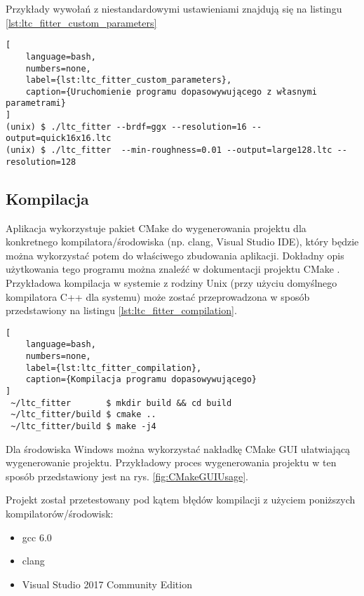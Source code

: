 \documentclass[../main.tex]{subfiles}
\begin{document}
Przykłady wywołań z niestandardowymi ustawieniami znajdują się na listingu \ref{lst:ltc_fitter_custom_parameters}

\begin{lstlisting}[
    language=bash,
    numbers=none,
    label={lst:ltc_fitter_custom_parameters},
    caption={Uruchomienie programu dopasowywującego z własnymi parametrami}
]
(unix) $ ./ltc_fitter --brdf=ggx --resolution=16 --output=quick16x16.ltc
(unix) $ ./ltc_fitter  --min-roughness=0.01 --output=large128.ltc --resolution=128
\end{lstlisting}

\subsection{Kompilacja}
\label{section:ltcFitterCompilation}

Aplikacja wykorzystuje pakiet CMake do wygenerowania projektu dla konkretnego kompilatora/środowiska (np. clang, Visual Studio IDE), który będzie można wykorzystać potem do właściwego zbudowania aplikacji. Dokładny opis użytkowania tego programu można znaleźć w dokumentacji projektu CMake \cite{CMakeDoc}. Przykładowa kompilacja w systemie z rodziny Unix (przy użyciu domyślnego kompilatora C++ dla systemu) może zostać przeprowadzona w sposób przedstawiony na listingu \ref{lst:ltc_fitter_compilation}.

\begin{lstlisting}[
    language=bash,
    numbers=none,
    label={lst:ltc_fitter_compilation},
    caption={Kompilacja programu dopasowywującego}
]
 ~/ltc_fitter       $ mkdir build && cd build
 ~/ltc_fitter/build $ cmake ..
 ~/ltc_fitter/build $ make -j4
\end{lstlisting}

Dla środowiska Windows można wykorzystać nakładkę CMake GUI ułatwiającą wygenerowanie projektu. Przykładowy proces wygenerowania projektu w ten sposób przedstawiony jest na rys. \ref{fig:CMakeGUIUsage}.

Projekt został przetestowany pod kątem błędów kompilacji z użyciem poniższych kompilatorów/środowisk:
\begin{itemize}
    \item gcc 6.0
    \item clang
    \item Visual Studio 2017 Community Edition
\end{itemize}
\end{document}
